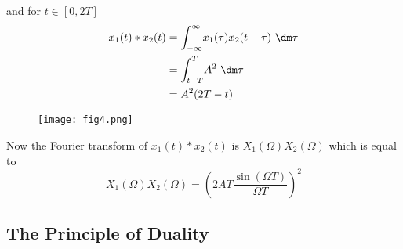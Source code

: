 	and for $t \in [0,2T]$
	\begin{align}
		x_1(t) \ast x_2(t) &= \int_{-\infty}^{\infty} \! x_1(\tau)x_2(t-\tau) \ \dm \tau\\
		&= \int_{t-T}^{T} \! A^2 \ \dm \tau \\
		&= A^2 (2T-t)
	\end{align}
	\begin{figure}[ht]
		\centering
		\texttt{[image: fig4.png]}
	\end{figure}
	Now the Fourier transform of $x_1(t)*x_2(t)$ is $X_1(\Omega)X_2(\Omega)$ which is equal to	
	\begin{equation}
		X_1(\Omega)X_2(\Omega) = \left( 2AT \frac{\sin(\Omega T)}{\Omega T} \right) ^2
	\end{equation}

\subsection{The Principle of Duality}

